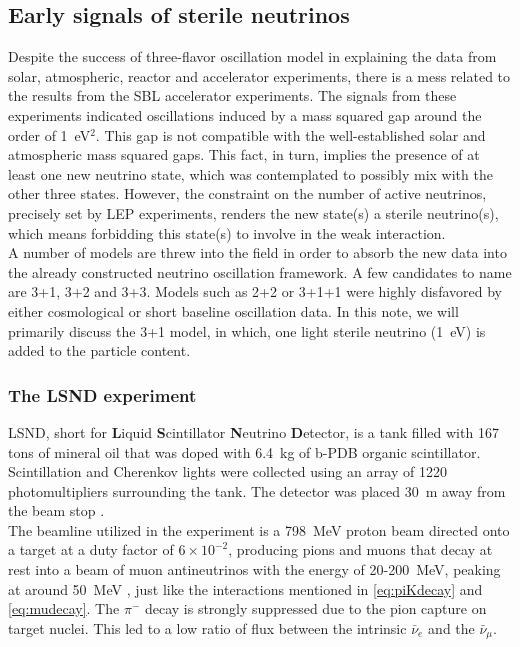 \subsection{Early signals of sterile neutrinos}
Despite the success of three-flavor oscillation model in explaining the data from solar, atmospheric, reactor and accelerator experiments, there is a mess related to the results from the SBL accelerator experiments. The signals from these experiments indicated oscillations induced by a mass squared gap around the order of 1~eV$^2$. This gap is not compatible with the well-established solar and atmospheric mass squared gaps. This fact, in turn, implies the presence of at least one new neutrino state, which was contemplated to possibly mix with the other three states. However, the constraint on the number of active neutrinos, precisely set by LEP experiments, renders the new state(s) a sterile neutrino(s), which means forbidding this state(s) to involve in the weak interaction.\\

A number of models are threw into the field in order to absorb the new data into the already constructed neutrino oscillation framework. A few candidates to name are 3+1, 3+2 and 3+3. Models such as 2+2 or 3+1+1 were highly disfavored by either cosmological or short baseline oscillation data. In this note, we will primarily discuss the 3+1 model, in which, one light sterile neutrino (1~eV) is added to the particle content.

\subsubsection{The LSND experiment}
LSND, short for \textbf{L}iquid \textbf{S}cintillator \textbf{N}eutrino \textbf{D}etector, is a tank filled with 167 tons of mineral oil that was doped with 6.4~kg of b-PDB organic scintillator. Scintillation and Cherenkov lights were collected using an array of 1220 photomultipliers surrounding the tank. The detector was placed 30~m away from the beam stop \cite{ATHANASSOPOULOS1997149}.\\

The beamline utilized in the experiment is a 798~MeV proton beam directed onto a target at a duty factor of $6\times 10^{-2}$, producing pions and muons that decay at rest into a beam of muon antineutrinos with the energy of 20-200~MeV, peaking at around 50~MeV \cite{PhysRevD.64.112007}, just like the interactions mentioned in \eqref{eq:piKdecay} and \eqref{eq:mudecay}. The $ \pi^- $ decay is strongly suppressed due to the pion capture on target nuclei. This led to a low ratio of flux between the intrinsic $ \bar{\nu}_e $ and the $ \bar{\nu}_\mu $.\\

